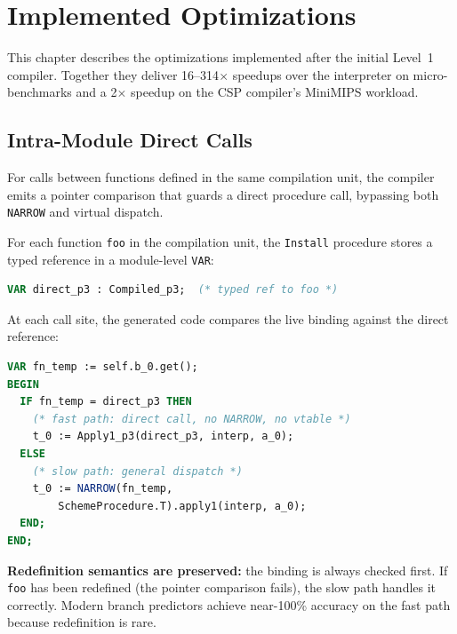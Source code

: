 \documentclass[12pt]{report}
\begin{document}
\chapter{Implemented Optimizations}
\label{ch:optimizations}

This chapter describes the optimizations implemented after the
initial Level~1 compiler.  Together they deliver 16--314$\times$
speedups over the interpreter on micro-benchmarks and a 2$\times$
speedup on the CSP compiler's MiniMIPS workload.

\section{Intra-Module Direct Calls}
\label{sec:opt-direct}

For calls between functions defined in the same compilation unit,
the compiler emits a pointer comparison that guards a direct
procedure call, bypassing both \texttt{NARROW} and virtual dispatch.

For each function \texttt{foo} in the compilation unit, the
\texttt{Install} procedure stores a typed reference in a
module-level \texttt{VAR}:

\begin{lstlisting}[language=Modula3]
VAR direct_p3 : Compiled_p3;  (* typed ref to foo *)
\end{lstlisting}

\noindent
At each call site, the generated code compares the live binding
against the direct reference:

\begin{lstlisting}[language=Modula3]
VAR fn_temp := self.b_0.get();
BEGIN
  IF fn_temp = direct_p3 THEN
    (* fast path: direct call, no NARROW, no vtable *)
    t_0 := Apply1_p3(direct_p3, interp, a_0);
  ELSE
    (* slow path: general dispatch *)
    t_0 := NARROW(fn_temp,
        SchemeProcedure.T).apply1(interp, a_0);
  END;
END;
\end{lstlisting}

\noindent
\textbf{Redefinition semantics are preserved:} the binding is
always checked first.  If \texttt{foo} has been redefined (the
pointer comparison fails), the slow path handles it correctly.
Modern branch predictors achieve near-100\% accuracy on the fast
path because redefinition is rare.
\end{document}
